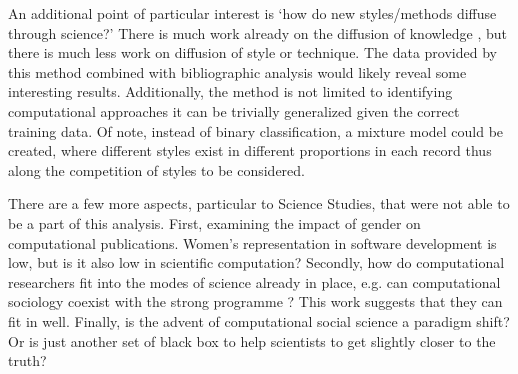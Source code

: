\documentclass[12pt, a4paper]{article}
\begin{document}
An additional point of particular interest is `how do new styles/methods diffuse through science?' There is much work already on the diffusion of knowledge \citep{griliches1960hybrid} \citep{crane1972invisible} \citep{evans2010industry}, but there is much less work on diffusion of style or technique. The data provided by this method combined with bibliographic analysis would likely reveal some interesting results. Additionally, the method is not limited to identifying computational approaches it can be trivially generalized given the correct training data. Of note, instead of binary classification, a mixture model could be created, where different styles exist in different proportions in each record thus along the competition of styles to be considered.

There are a few more aspects, particular to Science Studies, that were not able to be a part of this analysis. First, examining the impact of gender on computational publications. Women's representation in software development is low, but is it also low in scientific computation? Secondly, how do computational researchers fit into the modes of science already in place, e.g. can computational sociology coexist with the strong programme \citep{bloor1976strong}? This work suggests that they can fit in well. Finally, is the advent of computational social science a paradigm shift? Or is just another set of black box to help scientists to get slightly closer to the truth?

\newpage
\singlespacing
\setcounter{page}{1}
{}




\appendix
\end{document}

